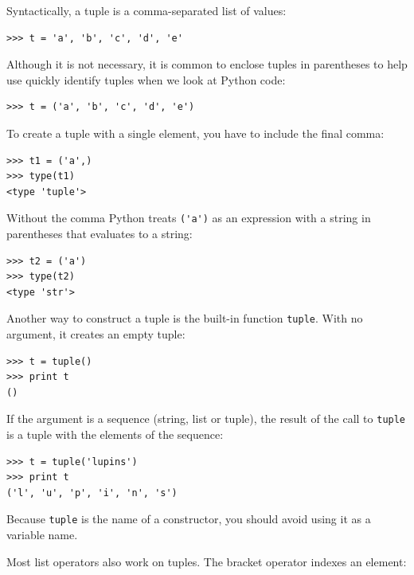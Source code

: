\documentclass[10pt]{book}
\begin{document}

Syntactically, a tuple is a comma-separated list of values:

\beforeverb
\begin{verbatim}
>>> t = 'a', 'b', 'c', 'd', 'e'
\end{verbatim}
\afterverb
%
Although it is not necessary, it is common to enclose tuples in
parentheses to help use quickly identify tuples when we look at
Python code:


\beforeverb
\begin{verbatim}
>>> t = ('a', 'b', 'c', 'd', 'e')
\end{verbatim}
\afterverb
%
To create a tuple with a single element, you have to include the final
comma:


\beforeverb
\begin{verbatim}
>>> t1 = ('a',)
>>> type(t1)
<type 'tuple'>
\end{verbatim}
\afterverb
%
Without the comma Python treats \verb"('a')" as an expression 
with a string in parentheses that evaluates to a string:

\beforeverb
\begin{verbatim}
>>> t2 = ('a')
>>> type(t2)
<type 'str'>
\end{verbatim}
\afterverb
%
Another way to construct a tuple is the built-in function {\tt tuple}.
With no argument, it creates an empty tuple:


\beforeverb
\begin{verbatim}
>>> t = tuple()
>>> print t
()
\end{verbatim}
\afterverb
%
If the argument is a sequence (string, list or tuple), the result
of the call to {\tt tuple}
is a tuple with the elements of the sequence:

\beforeverb
\begin{verbatim}
>>> t = tuple('lupins')
>>> print t
('l', 'u', 'p', 'i', 'n', 's')
\end{verbatim}
\afterverb
%
Because {\tt tuple} is the name of a constructor, you should
avoid using it as a variable name.

Most list operators also work on tuples.  The bracket operator
indexes an element:

\end{document}
